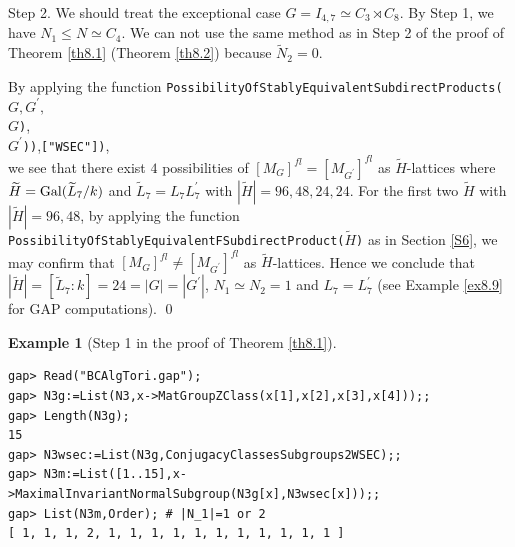 \documentclass{amsart}
\theoremstyle{plain}
\theoremstyle{definition}
\newtheorem{example}[theorem]{Example}
\theoremstyle{remark}
\begin{document}
{Step 2. We should treat the exceptional case 
$G=I_{4,7}\simeq C_3\rtimes C_8$. 
By Step 1, we have $N_1\leq N\simeq C_4$. 
We can not use the same method as in Step 2 of 
the proof of Theorem \ref{th8.1} (Theorem \ref{th8.2}) 
because $\widetilde{N}_2=0$. 

By applying the function 
{\tt PossibilityOfStablyEquivalentSubdirectProducts(}$G,G^\prime,$\\
$G${\tt )},\\
$G^\prime${\tt ))},{\tt ["WSEC"])},\\
we see that 
there exist $4$ possibilities of $[M_G]^{fl}=[M_{G^\prime}]^{fl}$ as 
$\widetilde{H}$-lattices where 
$\widetilde{H}={\rm Gal}(\widetilde{L}_7/k)$ 
and $\widetilde{L}_7=L_7L_7^\prime$ 
with $|\widetilde{H}|= 96, 48, 24, 24$. 
%
For the first two $\widetilde{H}$ with $|\widetilde{H}|= 96, 48$, 
by applying the function\\
{\tt PossibilityOfStablyEquivalentFSubdirectProduct($\widetilde{H}$)} 
as in Section \ref{S6}, 
we may confirm that 
$[M_G]^{fl}\neq [M_{G^\prime}]^{fl}$ as $\widetilde{H}$-lattices. 
Hence we conclude that 
$|\widetilde{H}|=[\widetilde{L}_7:k]=24=|G|=|G^\prime|$, 
$N_1\simeq N_2=1$ and $L_7=L_7^\prime$ (see Example \ref{ex8.9} for GAP computations). \qed

\bigskip
\begin{example}[Step 1 in the proof of Theorem \ref{th8.1}]\label{ex8.7}~\vspace*{-5mm}\\
\begin{verbatim}
gap> Read("BCAlgTori.gap");
gap> N3g:=List(N3,x->MatGroupZClass(x[1],x[2],x[3],x[4]));;
gap> Length(N3g);
15
gap> N3wsec:=List(N3g,ConjugacyClassesSubgroups2WSEC);;
gap> N3m:=List([1..15],x->MaximalInvariantNormalSubgroup(N3g[x],N3wsec[x]));;
gap> List(N3m,Order); # |N_1|=1 or 2
[ 1, 1, 1, 2, 1, 1, 1, 1, 1, 1, 1, 1, 1, 1, 1 ]
\end{verbatim}
\end{example}

}
\end{document}
